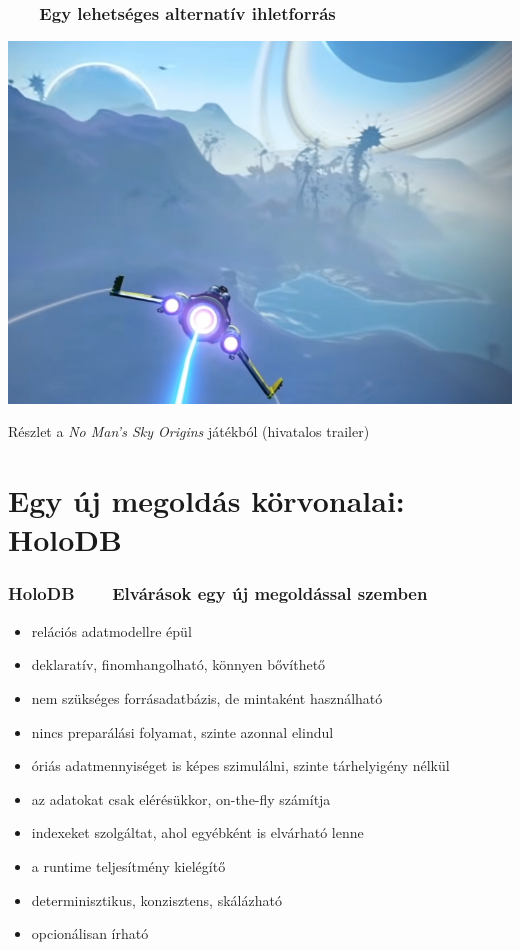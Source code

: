 \documentclass[
]{beamer}
\newcommand{\slidetitle}[2]{\frametitle{{\small #1 ~ \ding{226} ~ } \normalsize \textbf{#2} }}
\begin{document}
\begin{frame}
    \slidetitle{\sectionshorttitle}{Egy lehetséges alternatív ihletforrás}
    
    \centering
    
    \includegraphics[height=0.55\textwidth]{image/nomanssky.png}
    
    \smallskip
    
    Részlet a \textit{No Man's Sky Origins} játékból (hivatalos trailer)
\end{frame}

\section{Egy új megoldás körvonalai: HoloDB}
\def\sectionshorttitle{HoloDB}

\begin{frame}
    \slidetitle{\sectionshorttitle}{Elvárások egy új megoldással szemben}
    
    
    \begin{itemize}
        \setlength\itemsep{0.5em}
        \item relációs adatmodellre épül
        \item deklaratív, finomhangolható, könnyen bővíthető
        \item nem szükséges forrásadatbázis, de mintaként használható
        \item nincs preparálási folyamat, szinte azonnal elindul
        \item óriás adatmennyiséget is képes szimulálni, szinte tárhelyigény nélkül
        \item az adatokat csak elérésükkor, on-the-fly számítja
        \item indexeket szolgáltat, ahol egyébként is elvárható lenne
        \item a runtime teljesítmény kielégítő
        \item determinisztikus, konzisztens, skálázható
        \item opcionálisan írható
    \end{itemize}
\end{frame}
\end{document}
